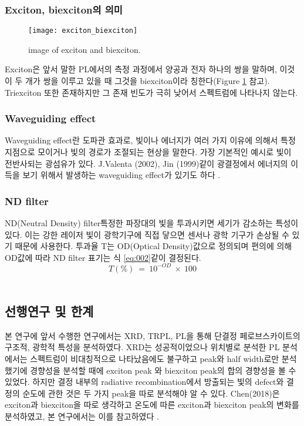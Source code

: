 \subsubsection{Exciton, biexciton의 의미}
\begin{figure}[H]
	\begin{center}
			\texttt{[image: exciton\_biexciton]}
	\end{center}
	\caption{image of exciton and biexciton.}
	\label{fig:ex}  
\end{figure}
Exciton은 앞서 말한 PL에서의 측정 과정에서 양공과 전자 하나의 쌍을 말하며, 이것이 두 개가 쌍을 이루고 있을 때 그것을 biexciton이라 칭한다(Figure \ref{fig:ex} 참고). Triexciton 또한 존재하지만 그 존재 빈도가 극히 낮어서 스펙트럼에 나타나지 않는다. 
\\
\subsubsection{Waveguiding effect}
Waveguiding effect란 도파관 효과로, 빛이나 에너지가 여러 가지 이유에 의해서 특정 지점으로 모이거나 빛의 경로가 조절되는 현상을 말한다. 가장 기본적인 예시로 빛이 전반사되는 광섬유가 있다. J.Valenta (2002), Jin (1999)\와 같이 광결정에서 에너지의 이득을 보기 위해서 발생하는 waveguiding effect가 있기도 하다\cite{valenta2002waveguiding} \cite{jin1999band}. 


\subsubsection{ND filter}
ND(Neutral Density) filter\는 특정한 파장대의 빛을 투과시키면 세기가 감소하는 특성이 있다. 이는 강한 레이저 빛이 광학기구에 직접 닿으면 센서나 광학 기구가 손상될 수 있기 때문에 사용한다. 투과율 T는 OD(Optical Density)값으로 정의되며 편의에 의해 OD값에 따라 ND filter 표기는 식 \ref{eq:002}\와 같이 결정된다.
\begin{equation}
T(\%)~=~10^{-OD}~\times~100
\label{eq:002}
\end{equation}
\\

\subsection{선행연구 및 한계}
본 연구에 앞서 수행한 연구에서는 XRD, TRPL, PL을 통해 단결정 페로브스카이트의 구조적, 광학적 특성을 분석하였다. XRD는 성공적이었으나 위치별로 분석한 PL 분석에서는 스펙트럼이 비대칭적으로 나타났음에도 불구하고 peak와 half width로만 분석했기에 경향성을 분석할 때에 exciton peak 와 biexciton peak의 합의 경향성을 볼 수 있었다. 하지만 결정 내부의 radiative recombination에서 방출되는 빛의 defect와 결정의 순도에 관한 것은 두 가지 peak을 따로 분석해야 알 수 있다. Chen(2018)은 exciton과 biexciton을 따로 생각하고 온도에 따른 exciton과 biexciton peak의 변화를 분석하였고, 본 연구에서는 이를 참고하였다 \cite{chen2018room}. 
\\

